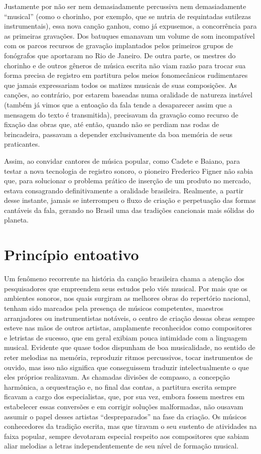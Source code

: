 Justamente por não ser nem demasiadamente percussiva nem demasiadamente
``musical'' (como o chorinho, por exemplo, que se nutria de requintadas
sutilezas instrumentais), essa nova canção ganhou, como já expusemos, a
concorrência para as primeiras gravações. Dos batuques emanavam um
volume de som incompatível com os parcos recursos de gravação
implantados pelos primeiros grupos de fonógrafos que aportaram no Rio de
Janeiro. De outra parte, os mestres do chorinho e de outros gêneros de
música escrita não viam razão para trocar sua forma precisa de registro
em partitura pelos meios fonomecânicos rudimentares que jamais
expressariam todos os matizes musicais de suas composições. As canções,
ao contrário, por estarem baseadas numa oralidade de natureza instável
(também já vimos que a entoação da fala tende a desaparecer assim que a
mensagem do texto é transmitida), precisavam da gravação como recurso de
fixação das obras que, até então, quando não se perdiam nas rodas de
brincadeira, passavam a depender exclusivamente da boa memória de seus
praticantes.

Assim, ao convidar cantores de música popular, como Cadete e Baiano,
para testar a nova tecnologia de registro sonoro, o pioneiro Frederico
Figner não sabia que, para solucionar o problema prático de inserção de
um produto no mercado, estava consagrando definitivamente a oralidade
brasileira. Realmente, a partir desse instante, jamais se interrompeu o
fluxo de criação e perpetuação das formas cantáveis da fala, gerando no
Brasil uma das tradições cancionais mais sólidas do planeta.

\section{Princípio entoativo}

Um fenômeno recorrente na história da canção brasileira chama a atenção
dos pesquisadores que empreendem seus estudos pelo viés musical. Por
mais que os ambientes sonoros, nos quais surgiram as melhores obras do
repertório nacional, tenham sido marcados pela presença de músicos
competentes, maestros arranjadores ou instrumentistas notáveis, o centro
de criação dessas obras sempre esteve nas mãos de outros artistas,
amplamente reconhecidos como compositores e letristas de sucesso, que em
geral exibiam pouca intimidade com a linguagem musical. Evidente que
quase todos dispunham de boa musicalidade, no sentido de reter melodias
na memória, reproduzir ritmos percussivos, tocar instrumentos de ouvido,
mas isso não significa que conseguissem traduzir intelectualmente o que
eles próprios realizavam. As chamadas divisões de compasso, a concepção
harmônica, a orquestração e, no final das contas, a partitura escrita
sempre ficavam a cargo dos especialistas, que, por sua vez, embora
fossem mestres em estabelecer essas conversões e em corrigir soluções
malformadas, não ousavam assumir o papel desses artistas
``despreparados'' na fase da criação. Os músicos conhecedores da
tradição escrita, mas que tiravam o seu sustento de atividades na faixa
popular, sempre devotaram especial respeito aos compositores que sabiam
aliar melodias a letras independentemente de seu nível de formação
musical.

